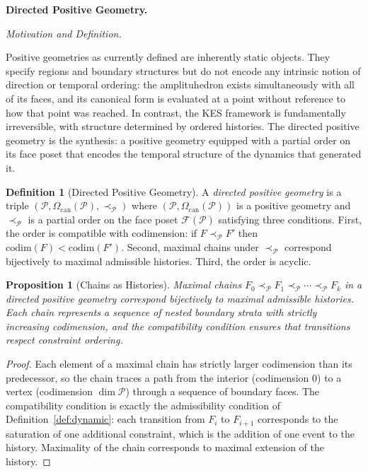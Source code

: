 \documentclass[12pt, oneside]{amsart}
\theoremstyle{plain}
\newtheorem{proposition}[theorem]{Proposition}
\theoremstyle{definition}
\newtheorem{definition}[theorem]{Definition}
\theoremstyle{remark}
\newcommand{\CF}{\Omega_{\mathrm{can}}}
\begin{document}
\bigskip\noindent\textbf{Directed Positive Geometry.}
\label{sec:directed}

\medskip\noindent\textit{Motivation and Definition.}

Positive geometries as currently defined are inherently static objects. They specify regions and boundary structures but do not encode any intrinsic notion of direction or temporal ordering: the amplituhedron exists simultaneously with all of its faces, and its canonical form is evaluated at a point without reference to how that point was reached. In contrast, the KES framework is fundamentally irreversible, with structure determined by ordered histories. The directed positive geometry is the synthesis: a positive geometry equipped with a partial order on its face poset that encodes the temporal structure of the dynamics that generated it.

\begin{definition}[Directed Positive Geometry]
\label{def:dpg}
A \emph{directed positive geometry} is a triple $(\mathcal{P}, \CF(\mathcal{P}), \prec_{\mathcal{P}})$ where $(\mathcal{P}, \CF(\mathcal{P}))$ is a positive geometry and $\prec_{\mathcal{P}}$ is a partial order on the face poset $\mathcal{F}(\mathcal{P})$ satisfying three conditions. First, the order is compatible with codimension: if $F \prec_{\mathcal{P}} F'$ then $\mathrm{codim}(F) < \mathrm{codim}(F')$. Second, maximal chains under $\prec_{\mathcal{P}}$ correspond bijectively to maximal admissible histories. Third, the order is acyclic.
\end{definition}

\begin{proposition}[Chains as Histories]
Maximal chains $F_0 \prec_{\mathcal{P}} F_1 \prec_{\mathcal{P}} \cdots \prec_{\mathcal{P}} F_k$ in a directed positive geometry correspond bijectively to maximal admissible histories. Each chain represents a sequence of nested boundary strata with strictly increasing codimension, and the compatibility condition ensures that transitions respect constraint ordering.
\end{proposition}

\begin{proof}
Each element of a maximal chain has strictly larger codimension than its predecessor, so the chain traces a path from the interior (codimension 0) to a vertex (codimension $\dim\mathcal{P}$) through a sequence of boundary faces. The compatibility condition is exactly the admissibility condition of Definition~\ref{def:dynamic}: each transition from $F_i$ to $F_{i+1}$ corresponds to the saturation of one additional constraint, which is the addition of one event to the history. Maximality of the chain corresponds to maximal extension of the history.
\end{proof}
\end{document}
